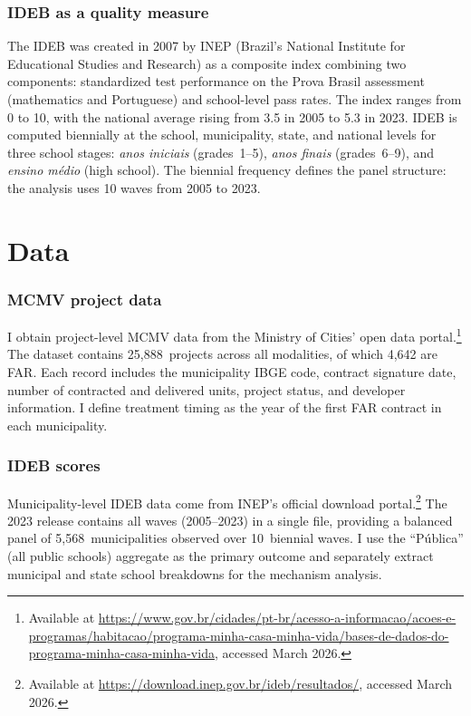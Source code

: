 \documentclass[12pt]{article}
\begin{document}
\subsubsection*{IDEB as a quality measure} The IDEB was created in 2007 by INEP (Brazil's National Institute for Educational Studies and Research) as a composite index combining two components: standardized test performance on the Prova Brasil assessment (mathematics and Portuguese) and school-level pass rates. The index ranges from 0 to 10, with the national average rising from 3.5 in 2005 to 5.3 in 2023. IDEB is computed biennially at the school, municipality, state, and national levels for three school stages: \textit{anos iniciais} (grades~1--5), \textit{anos finais} (grades~6--9), and \textit{ensino m\'edio} (high school). The biennial frequency defines the panel structure: the analysis uses 10 waves from 2005 to 2023.


\section{Data}

\subsubsection*{MCMV project data} I obtain project-level MCMV data from the Ministry of Cities' open data portal.\footnote{Available at \url{https://www.gov.br/cidades/pt-br/acesso-a-informacao/acoes-e-programas/habitacao/programa-minha-casa-minha-vida/bases-de-dados-do-programa-minha-casa-minha-vida}, accessed March 2026.} The dataset contains 25,888~projects across all modalities, of which 4,642 are FAR. Each record includes the municipality IBGE code, contract signature date, number of contracted and delivered units, project status, and developer information. I define treatment timing as the year of the first FAR contract in each municipality.

\subsubsection*{IDEB scores} Municipality-level IDEB data come from INEP's official download portal.\footnote{Available at \url{https://download.inep.gov.br/ideb/resultados/}, accessed March 2026.} The 2023 release contains all waves (2005--2023) in a single file, providing a balanced panel of 5,568~municipalities observed over 10~biennial waves. I use the ``P\'ublica'' (all public schools) aggregate as the primary outcome and separately extract municipal and state school breakdowns for the mechanism analysis.
\end{document}
